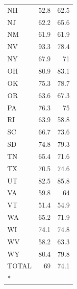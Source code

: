 \begin{longtable}[t]{lrr}
NH & 52.8 & 62.5\\
NJ & 62.2 & 65.6\\
NM & 61.9 & 61.9\\
NV & 93.3 & 78.4\\
NY & 67.9 & 71\\
\addlinespace
OH & 80.9 & 83.1\\
OK & 75.3 & 78.7\\
OR & 63.6 & 67.3\\
PA & 76.3 & 75\\
RI & 63.9 & 58.8\\
\addlinespace
SC & 66.7 & 73.6\\
SD & 74.8 & 79.3\\
TN & 65.4 & 71.6\\
TX & 70.5 & 74.6\\
UT & 82.5 & 85.8\\
\addlinespace
VA & 59.8 & 64\\
VT & 51.4 & 54.9\\
WA & 65.2 & 71.9\\
WI & 74.1 & 74.8\\
WV & 58.2 & 63.3\\
\addlinespace
WY & 80.4 & 79.8\\
TOTAL & 69 & 74.1\\*
\end{longtable}
\endgroup{}
